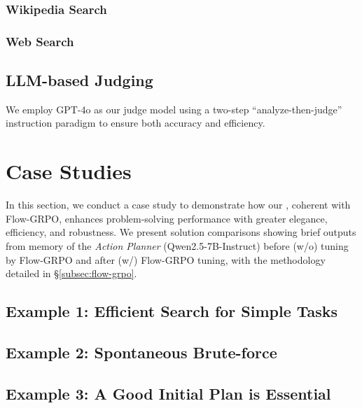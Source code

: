 \clearpage
\subsubsection{Wikipedia Search}


\clearpage
\subsubsection{Web Search}


\clearpage
\subsection{LLM-based Judging}
\label{app:llm_based_judging}
We employ GPT-4o as our judge model using a two-step ``analyze-then-judge'' instruction paradigm to ensure both accuracy and efficiency.



\clearpage
\section{Case Studies}
\label{app:case_studies}
In this section, we conduct a case study to demonstrate how our \model, coherent with Flow-GRPO, enhances problem-solving performance with greater elegance, efficiency, and robustness. We present solution comparisons showing brief outputs from memory of the \textit{Action Planner} (Qwen2.5-7B-Instruct) before (w/o) tuning by Flow-GRPO and after (w/) Flow-GRPO tuning, with the methodology detailed in \S\ref{subsec:flow-grpo}.


\subsection{Example 1: Efficient Search for Simple Tasks}
\label{case1_gameof24_3B}


\subsection{Example 2: Spontaneous Brute-force}
\label{case2_gameof24_7B}


\clearpage
\subsection{Example 3: A Good Initial Plan is Essential}
\label{case3_gaia_1}


